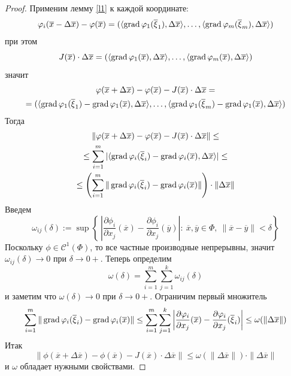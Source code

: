 \begin{proof}
    Применим лемму \ref{l1} к каждой координате:
    \[\varphi_i(\overline{x}-\Delta\overline{x})-\varphi(\overline{x})=(\langle \operatorname*{grad} \varphi_1(\overline{\xi}_1), \Delta \overline{x} \rangle, \dots, \langle \operatorname*{grad} \varphi_m(\overline{\xi}_m), \Delta \overline{x} \rangle)\]
    при этом
    \[J(\overline{x})\cdot \Delta \overline{x}=(\langle \operatorname*{grad} \varphi_1(\overline{x}), \Delta \overline{x} \rangle, \dots, \langle \operatorname*{grad} \varphi_m(\overline{x}), \Delta \overline{x} \rangle)\]
    значит
    \begin{multline*}
        \varphi(\overline{x}+\Delta\overline{x})-\varphi(\overline{x})-J(\overline{x})\cdot \Delta\overline{x}=\\
        =(\langle \operatorname*{grad} \varphi_1(\overline{\xi}_1)-\operatorname*{grad} \varphi_1(\overline{x}), \Delta \overline{x} \rangle, \dots, \langle \operatorname*{grad} \varphi_1(\overline{\xi}_m)-\operatorname*{grad} \varphi_1(\overline{x}), \Delta \overline{x} \rangle)
    \end{multline*}
    Тогда 
    \begin{multline*}
        \|\varphi(\overline{x}+\Delta \overline{x})-\varphi(\overline{x})-J(\overline{x})\cdot \Delta\overline{x}\|\leq\\
        \leq \sum\limits_{i=1}^{m}|\langle \operatorname*{grad} \varphi_i(\overline{\xi}_i)-\operatorname*{grad} \varphi_i(\overline{x}), \Delta\overline{x} \rangle|\leq\\
        \leq \left(\sum\limits_{i=1}^{m}\|\operatorname*{grad} \varphi_i(\overline{\xi}_i)-\operatorname*{grad} \varphi_i(\overline{x})\|\right)\cdot \|\Delta \overline{x}\|
    \end{multline*}
    Введем 
    \[\omega_{ij}(\delta):=\sup\left\{\ \left|\frac{\partial \phi_i}{\partial x_j}(\overline{x})-\frac{\partial \phi_i}{\partial x_j}(\overline{y})\right|:\ \overline{x}, \overline{y}\in \Phi,\ \|\overline{x}-\overline{y}\|<\delta\right\}\]
    Поскольку $\phi\in \mathcal{C}^1(\Phi)$, то все частные производные непрерывны, значит $\omega_{ij}(\delta)\to 0$ при $\delta\to 0+$.
    Теперь определим
    \[\omega(\delta)=\sum\limits_{i=1}^{m}\sum\limits_{j=1}^{k}\omega_{ij}(\delta)\]
    и заметим что $\omega(\delta)\to 0$ при $\delta\to 0+$. Ограничим первый множитель
    \[\sum\limits_{i=1}^{m}\|\operatorname*{grad} \varphi_i(\overline{\xi}_i)-\operatorname*{grad} \varphi_i(\overline{x})\|\leq \sum\limits_{i=1}^{m}\sum\limits_{j=1}^{k}\left|\frac{\partial \varphi_i}{\partial x_j}(\overline{x})-\frac{\partial \varphi_i}{\partial x_j}(\overline{\xi}_i)\right|\leq \omega(\|\Delta \overline{x}\|)\]
    Итак
    \[\|\phi(\overline{x}+\Delta \overline{x})-\phi(\overline{x})-J(\overline{x})\cdot \Delta\overline{x}\|\leq \omega(\|\Delta \overline{x}\|)\cdot \|\Delta \overline{x}\|\]
    и $\omega$ обладает нужными свойствами.
\end{proof}
\newpage